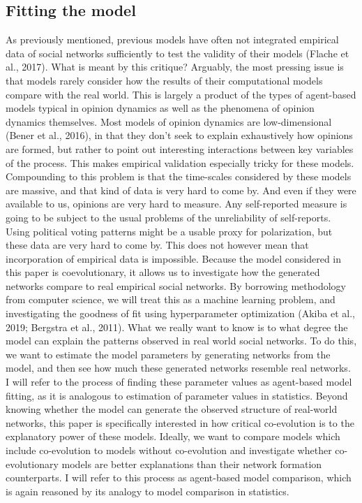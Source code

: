 \documentclass{article}
\begin{document}
\subsection{Fitting the model}
As previously mentioned, previous models have often not integrated empirical data of social networks sufficiently to test the validity of their models (Flache et al., 2017). What is meant by this critique? Arguably, the most pressing issue is that models rarely consider how the results of their computational models compare with the real world. This is largely a product of the types of agent-based models typical in opinion dynamics as well as the phenomena of opinion dynamics themselves. Most models of opinion dynamics are low-dimensional (Bener et al., 2016), in that they don’t seek to explain exhaustively how opinions are formed, but rather to point out interesting interactions between key variables of the process. This makes empirical validation especially tricky for these models. Compounding to this problem is that the time-scales considered by these models are massive, and that kind of data is very hard to come by. And even if they were available to us, opinions are very hard to measure. Any self-reported measure is going to be subject to the usual problems of the unreliability of self-reports. Using political voting patterns might be a usable proxy for polarization, but these data are very hard to come by. 
This does not however mean that incorporation of empirical data is impossible. Because the model considered in this paper is coevolutionary, it allows us to investigate how the generated networks compare to real empirical social networks. By borrowing methodology from computer science, we will treat this as a machine learning problem, and investigating the goodness of fit using hyperparameter optimization (Akiba et al., 2019; Bergstra et al., 2011). What we really want to know is to what degree the model can explain the patterns observed in real world social networks. To do this, we want to estimate the model parameters by generating networks from the model, and then see how much these generated networks resemble real networks. I will refer to the process of finding these parameter values as agent-based model fitting, as it is analogous to estimation of parameter values in statistics. Beyond knowing whether the model can generate the observed structure of real-world networks, this paper is specifically interested in how critical co-evolution is to the explanatory power of these models. Ideally, we want to compare models which include co-evolution to models without co-evolution and investigate whether co-evolutionary models are better explanations than their network formation counterparts. I will refer to this process as agent-based model comparison, which is again reasoned by its analogy to model comparison in statistics. 
\end{document}

